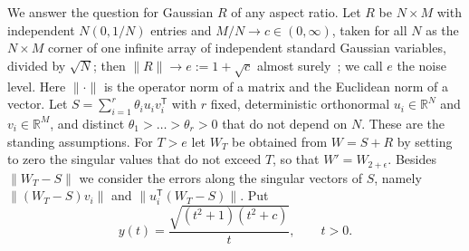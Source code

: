 \documentclass[11pt]{amsart}
\theoremstyle{remark}
\numberwithin{equation}{section}
\newcommand{\R}{\mathbb R}
\begin{document}
We answer the question for Gaussian $R$ of any aspect ratio. Let $R$ be $N\times M$ with independent $N(0,1/N)$ entries and $M/N\to c\in(0,\infty)$, taken for all $N$ as the $N\times M$ corner of one infinite array of independent standard Gaussian variables, divided by $\sqrt N$; then $\|R\|\to e:=1+\sqrt c$ almost surely~\cite{Geman}; we call $e$ the noise level. Here $\|\cdot\|$ is the operator norm of a matrix and the Euclidean norm of a vector. Let $S=\sum_{i=1}^r\theta_iu_iv_i^{\mathsf T}$ with $r$ fixed, deterministic orthonormal $u_i\in\R^N$ and $v_i\in\R^M$, and distinct $\theta_1>\dots>\theta_r>0$ that do not depend on $N$. These are the standing assumptions. For $T>e$ let $W_T$ be obtained from $W=S+R$ by setting to zero the singular values that do not exceed $T$, so that $W'=W_{2+\epsilon}$. Besides $\|W_T-S\|$ we consider the errors along the singular vectors of $S$, namely $\|(W_T-S)v_i\|$ and $\|u_i^{\mathsf T}(W_T-S)\|$. Put
\begin{equation}\label{eq:y}
y(t)=\frac{\sqrt{(t^2+1)(t^2+c)}}{t},\qquad t>0 .
\end{equation}
\end{document}
